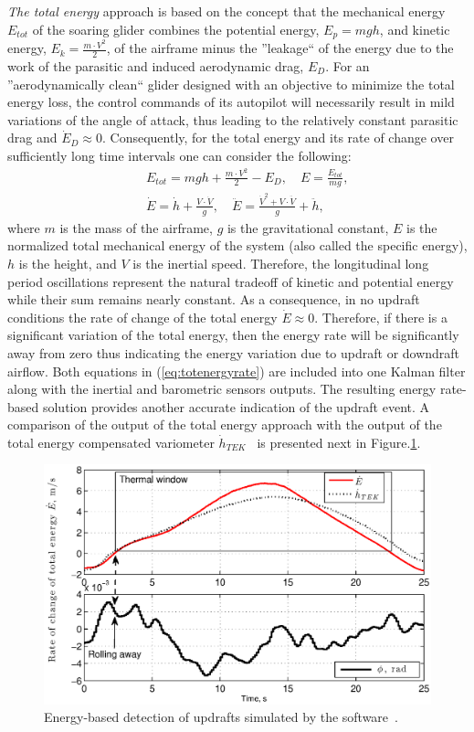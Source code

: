 \documentclass[letterpaper, 10 pt, conference]{ieeeconf}  %
\begin{document}
\emph{The total energy} approach is based on the concept that the mechanical energy $E_{tot}$ of
the soaring glider combines the potential energy, $E_p=mgh$, and kinetic energy, $E_k=\frac{m\cdot V^2}{2}$, of the airframe minus the ''leakage`` of the energy due to the work of the parasitic and induced aerodynamic drag, $E_{D}$. For an ''aerodynamically clean`` glider designed with an objective to
minimize the total energy loss, the control commands of its autopilot will necessarily result in mild variations of the angle of attack, thus leading to the relatively constant parasitic drag and $\dot{E}_{D}\approx0$. Consequently, for the total energy and its rate of change over sufficiently
long time intervals one can consider the following:
\begin{eqnarray}
    && E_{tot}=mgh+\frac{m\cdot V^2}{2}-E_{D}, \quad E=\frac{E_{tot}}{mg}, \nonumber \\
    && \dot{E}=\dot{h}+\frac{V \cdot \dot{V}}{g}, \quad \ddot{E}=\frac{\dot{V}^2 + V \cdot
    \ddot{V}}{g} + \ddot{h},
    \label{eq:totenergyrate}
\end{eqnarray}
where $m$ is the mass of the airframe, $g$ is the gravitational constant, $E$ is the normalized total mechanical energy of the system (also called the specific energy), $h$ is the height, and $V$ is the inertial speed. Therefore, the longitudinal long period oscillations represent the natural tradeoff of kinetic and potential energy while their sum remains nearly constant. As a consequence, in no updraft conditions the rate of change of the total energy $\dot{E}\approx 0$. Therefore, if there is a significant variation of the total energy, then the energy rate will be significantly away from zero thus indicating the energy variation due to updraft or downdraft airflow. Both equations in (\ref{eq:totenergyrate}) are included into one Kalman filter along with the inertial and barometric sensors outputs. The resulting energy rate-based solution provides another accurate indication of the updraft event. A comparison of the output of the total energy approach with the output of the total energy compensated variometer $\dot{h}_{TEK}$~\cite{PitLab:2013:Online} is presented next in Figure.\ref{fig:ThermalDetection}.
\begin{figure}[thpb]
  \centering
  \includegraphics[scale=0.4]{Figures/TEK_Bank.eps}
  \caption{Energy-based detection of updrafts simulated by the software~\cite{Condor:2013:Online}.}
  \label{fig:ThermalDetection}
\end{figure}
\end{document}
